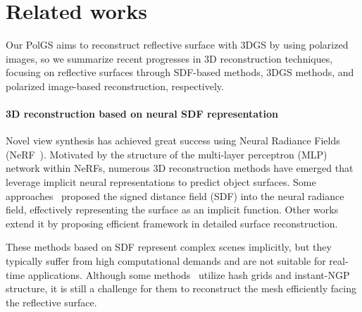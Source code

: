 
\section{Related works}
Our PolGS aims to reconstruct reflective surface with 3DGS by using polarized images, so we summarize recent progresses in 3D reconstruction techniques, focusing on reflective surfaces through SDF-based methods, 3DGS methods, and polarized image-based reconstruction, respectively.

\vspace{-0.6em}

\paragraph{3D reconstruction based on neural SDF representation}
Novel view synthesis has achieved great success using Neural Radiance Fields (NeRF~\cite{mildenhall2020nerf}). Motivated by the structure of the multi-layer perceptron (MLP) network within NeRFs, numerous 3D reconstruction methods have emerged that leverage implicit neural representations to predict object surfaces. Some approaches~\cite{niemeyer2020differentiable, yariv2020multiview} proposed the signed distance field (SDF) into the neural radiance field, effectively representing the surface as an implicit function. 
Other works~\cite{wang2021neus, yariv2021volume, oechsle2021unisurf, wang2022hf, wang2023neus2,li2023neuralangelo} extend it by proposing efficient framework in detailed surface reconstruction.

These methods based on SDF represent complex scenes implicitly, but they typically suffer from high computational demands and are not suitable for real-time applications. Although some methods~\cite{wang2023neus2, li2023neuralangelo} utilize hash grids and instant-NGP~\cite{mueller2022instant} structure, it is still a challenge for them to reconstruct the mesh efficiently facing the reflective surface. 

